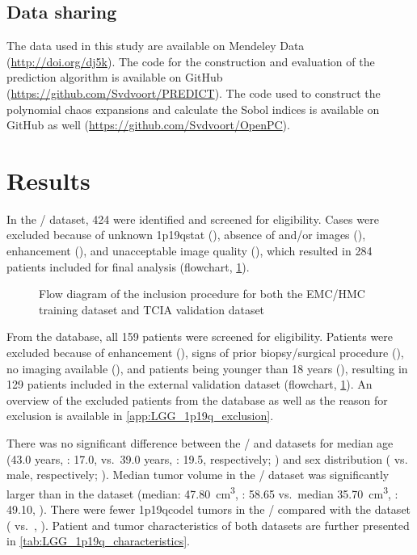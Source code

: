 \subsection{Data sharing}

The data used in this study are available on Mendeley Data (\url{http://doi.org/dj5k}).
The code for the construction and evaluation of the prediction algorithm is available on GitHub (\url{https://github.com/Svdvoort/PREDICT}).
The code used to construct the polynomial chaos expansions and calculate the Sobol indices is available on GitHub as well \hfill \break (\url{https://github.com/Svdvoort/OpenPC}).


\section{Results}

In the / dataset, 424  were identified and screened for eligibility.
Cases were excluded because of unknown \acl{1p19qstat} (), absence of  and/or   images (), enhancement (), and unacceptable image quality (), which resulted in 284 patients included for final analysis (flowchart, \cref{fig:LGG_1p19q_flowchart}).

\begin{figure}
\centering

\caption{Flow diagram of the inclusion procedure for both the \acrshort{EMC}/\acrshort{HMC} training dataset and \acrshort{TCIA} validation dataset}\label{fig:LGG_1p19q_flowchart}
\end{figure}


From the  database, all 159 patients were screened for eligibility.
Patients were excluded because of enhancement (), signs of prior biopsy/surgical procedure (), no  imaging available (), and patients being younger than 18 years (), resulting in 129 patients included in the external validation dataset (flowchart, \cref{fig:LGG_1p19q_flowchart}).
An overview of the excluded patients from the  database as well as the reason for exclusion is available in \cref{app:LGG_1p19q_exclusion}.

There was no significant difference between the / and  datasets for median age (\num{43.0} years, : \num{17.0}, vs.\ \num{39.0} years, : \num{19.5}, respectively; ) and sex distribution ( vs.\  male, respectively; ).
Median tumor volume in the / dataset was significantly larger than in the  dataset (median: \SI{47.80}{\centi\meter\cubed}, : \num{58.65} vs.\ median \SI{35.70}{\centi\meter\cubed}, : \num{49.10}, ).
There were fewer \acl{1p19qcodel} tumors in the / compared with the  dataset ( vs.\ , ).
Patient and tumor characteristics of both datasets are further presented in \cref{tab:LGG_1p19q_characteristics}.

